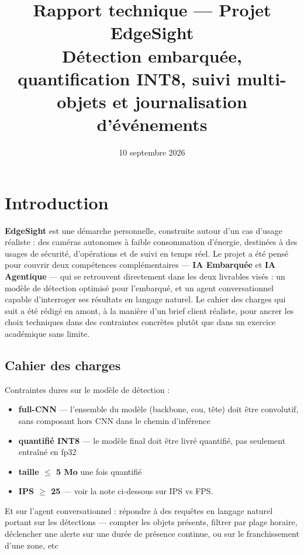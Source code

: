 \documentclass[11pt,a4paper]{article}
\title{Rapport technique --- Projet EdgeSight\\[0.3em]\large Détection embarquée, quantification INT8, suivi multi-objets et journalisation d'événements}
\author{}
\date{10 septembre 2026}
\let\Oldsubsection\subsection
\renewcommand{\subsection}{\FloatBarrier\Oldsubsection}
\begin{document}
    \maketitle
    
    \section{Introduction}
    
    \textbf{EdgeSight} est une démarche personnelle, construite autour d'un
    cas d'usage réaliste : des caméras autonomes à faible consommation
    d'énergie, destinées à des usages de sécurité, d'opérations et de
    suivi en temps réel. Le projet a été pensé pour couvrir deux
    compétences complémentaires --- \textbf{IA Embarquée} et \textbf{IA
    Agentique} --- qui se retrouvent directement dans les deux livrables
    visés : un modèle de détection optimisé pour l'embarqué, et un agent
    conversationnel capable d'interroger ses résultats en langage naturel.
    Le cahier des charges qui suit a été rédigé en amont, à la manière
    d'un brief client réaliste, pour ancrer les choix techniques dans des
    contraintes concrètes plutôt que dans un exercice académique sans
    limite.
    
    \subsection{Cahier des charges}
    
    Contraintes dures sur le modèle de détection :
    
    \begin{itemize}[leftmargin=1.5em]
      \item \textbf{full-CNN} --- l'ensemble du modèle (backbone, cou, tête) doit
        être convolutif, sans composant hors CNN dans le chemin d'inférence
      \item \textbf{quantifié INT8} --- le modèle final doit être livré
        quantifié, pas seulement entraîné en fp32
      \item \textbf{taille $\leq$ 5 Mo} une fois quantifié
      \item \textbf{IPS $\geq$ 25} --- voir la note ci-dessous sur IPS vs
        FPS.
    \end{itemize}
    
    Et sur l'agent conversationnel : répondre à des requêtes en langage
    naturel portant sur les détections --- compter les objets présents,
    filtrer par plage horaire, déclencher une alerte sur une durée de
    présence continue, ou sur le franchissement d'une zone, etc
    
\end{document}
